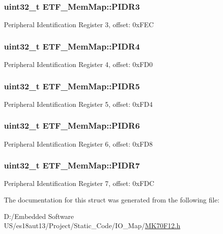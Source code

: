 \subsubsection[{P\+I\+D\+R3}]{\setlength{\rightskip}{0pt plus 5cm}uint32\+\_\+t E\+T\+F\+\_\+\+Mem\+Map\+::\+P\+I\+D\+R3}\label{struct_e_t_f___mem_map_a1132bf279f207a39e89f2fab3d384308}
Peripheral Identification Register 3, offset\+: 0x\+F\+E\+C \hypertarget{struct_e_t_f___mem_map_a955a81d9c5e73e129ca965fa226bfde8}{}
\subsubsection[{P\+I\+D\+R4}]{\setlength{\rightskip}{0pt plus 5cm}uint32\+\_\+t E\+T\+F\+\_\+\+Mem\+Map\+::\+P\+I\+D\+R4}\label{struct_e_t_f___mem_map_a955a81d9c5e73e129ca965fa226bfde8}
Peripheral Identification Register 4, offset\+: 0x\+F\+D0 \hypertarget{struct_e_t_f___mem_map_a3054ae260a217f950e2c7793ff27855d}{}
\subsubsection[{P\+I\+D\+R5}]{\setlength{\rightskip}{0pt plus 5cm}uint32\+\_\+t E\+T\+F\+\_\+\+Mem\+Map\+::\+P\+I\+D\+R5}\label{struct_e_t_f___mem_map_a3054ae260a217f950e2c7793ff27855d}
Peripheral Identification Register 5, offset\+: 0x\+F\+D4 \hypertarget{struct_e_t_f___mem_map_a3448111767c72273ead546c08f49047b}{}
\subsubsection[{P\+I\+D\+R6}]{\setlength{\rightskip}{0pt plus 5cm}uint32\+\_\+t E\+T\+F\+\_\+\+Mem\+Map\+::\+P\+I\+D\+R6}\label{struct_e_t_f___mem_map_a3448111767c72273ead546c08f49047b}
Peripheral Identification Register 6, offset\+: 0x\+F\+D8 \hypertarget{struct_e_t_f___mem_map_a53393d8ce48a43bed1d5568561776a5c}{}
\subsubsection[{P\+I\+D\+R7}]{\setlength{\rightskip}{0pt plus 5cm}uint32\+\_\+t E\+T\+F\+\_\+\+Mem\+Map\+::\+P\+I\+D\+R7}\label{struct_e_t_f___mem_map_a53393d8ce48a43bed1d5568561776a5c}
Peripheral Identification Register 7, offset\+: 0x\+F\+D\+C 

The documentation for this struct was generated from the following file\+:\begin{DoxyCompactItemize}
\item 
D\+:/\+Embedded Software U\+S/es18aut13/\+Project/\+Static\+\_\+\+Code/\+I\+O\+\_\+\+Map/\hyperlink{_m_k70_f12_8h}{M\+K70\+F12.\+h}\end{DoxyCompactItemize}
